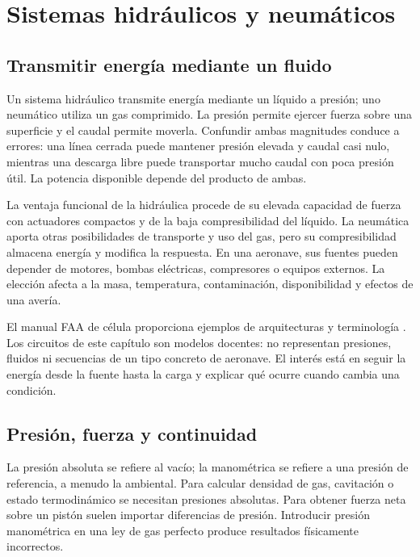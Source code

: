 \chapter{Sistemas hidráulicos y neumáticos}\label{ch:21}

\section{Transmitir energía mediante un fluido}
Un sistema hidráulico transmite energía mediante un líquido a presión; uno neumático utiliza un gas comprimido. La presión permite ejercer fuerza sobre una superficie y el caudal permite moverla. Confundir ambas magnitudes conduce a errores: una línea cerrada puede mantener presión elevada y caudal casi nulo, mientras una descarga libre puede transportar mucho caudal con poca presión útil. La potencia disponible depende del producto de ambas.

La ventaja funcional de la hidráulica procede de su elevada capacidad de fuerza con actuadores compactos y de la baja compresibilidad del líquido. La neumática aporta otras posibilidades de transporte y uso del gas, pero su compresibilidad almacena energía y modifica la respuesta. En una aeronave, sus fuentes pueden depender de motores, bombas eléctricas, compresores o equipos externos. La elección afecta a la masa, temperatura, contaminación, disponibilidad y efectos de una avería.

El manual FAA de célula proporciona ejemplos de arquitecturas y terminología \cite{FAA-AIRFRAME}. Los circuitos de este capítulo son modelos docentes: no representan presiones, fluidos ni secuencias de un tipo concreto de aeronave. El interés está en seguir la energía desde la fuente hasta la carga y explicar qué ocurre cuando cambia una condición.


\section{Presión, fuerza y continuidad}
La presión absoluta se refiere al vacío; la manométrica se refiere a una presión de referencia, a menudo la ambiental. Para calcular densidad de gas, cavitación o estado termodinámico se necesitan presiones absolutas. Para obtener fuerza neta sobre un pistón suelen importar diferencias de presión. Introducir presión manométrica en una ley de gas perfecto produce resultados físicamente incorrectos.

